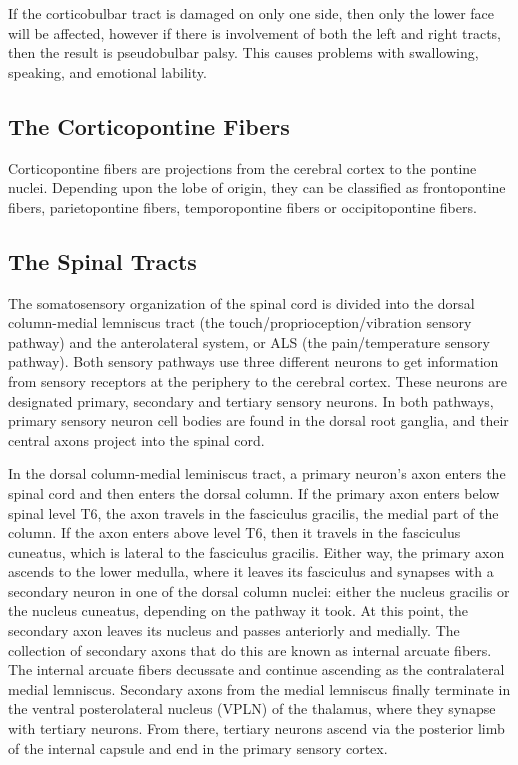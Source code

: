 If the corticobulbar tract is damaged on only one side, then only the lower face will be affected, however if there is involvement of both the left and right tracts, then the result is pseudobulbar palsy. This causes problems with swallowing, speaking, and emotional lability.

\hypertarget{the-corticopontine-fibers}{%
\subsection{The Corticopontine Fibers}\label{the-corticopontine-fibers}}

Corticopontine fibers are projections from the cerebral cortex to the pontine nuclei. Depending upon the lobe of origin, they can be classified as frontopontine fibers, parietopontine fibers, temporopontine fibers or occipitopontine fibers.

\hypertarget{the-spinal-tracts}{%
\subsection{The Spinal Tracts}\label{the-spinal-tracts}}

The somatosensory organization of the spinal cord is divided into the dorsal column-medial lemniscus tract (the touch/proprioception/vibration sensory pathway) and the anterolateral system, or ALS (the pain/temperature sensory pathway). Both sensory pathways use three different neurons to get information from sensory receptors at the periphery to the cerebral cortex. These neurons are designated primary, secondary and tertiary sensory neurons. In both pathways, primary sensory neuron cell bodies are found in the dorsal root ganglia, and their central axons project into the spinal cord.

In the dorsal column-medial leminiscus tract, a primary neuron's axon enters the spinal cord and then enters the dorsal column. If the primary axon enters below spinal level T6, the axon travels in the fasciculus gracilis, the medial part of the column. If the axon enters above level T6, then it travels in the fasciculus cuneatus, which is lateral to the fasciculus gracilis. Either way, the primary axon ascends to the lower medulla, where it leaves its fasciculus and synapses with a secondary neuron in one of the dorsal column nuclei: either the nucleus gracilis or the nucleus cuneatus, depending on the pathway it took. At this point, the secondary axon leaves its nucleus and passes anteriorly and medially. The collection of secondary axons that do this are known as internal arcuate fibers. The internal arcuate fibers decussate and continue ascending as the contralateral medial lemniscus. Secondary axons from the medial lemniscus finally terminate in the ventral posterolateral nucleus (VPLN) of the thalamus, where they synapse with tertiary neurons. From there, tertiary neurons ascend via the posterior limb of the internal capsule and end in the primary sensory cortex.

